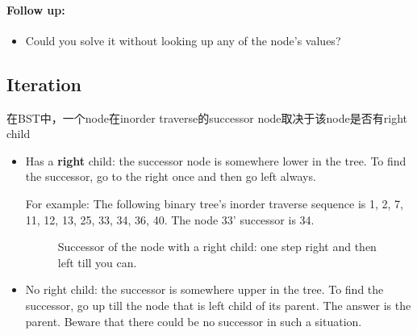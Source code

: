 \paragraph{Follow up:}

\begin{itemize}
\item Could you solve it without looking up any of the node's values?
\end{itemize}

\subsection{Iteration}
在BST中，一个node在inorder traverse的successor node取决于该node是否有right child

\begin{itemize}
\item Has a \textbf{right} child: the successor node is somewhere lower in the tree. To find the successor, go to the right once and then go left always.

For example: The following binary tree's inorder traverse sequence is 1, 2, 7, 11, 12, 13, 25, 33, 34, 36, 40. The node 33' successor is 34.
\begin{figure}[H]
\caption{Successor of the node with a right child: one step right and then left till you can.}
\end{figure}
\item No right child: the successor is somewhere upper in the tree. To find the successor, go up till the node that is left child of its parent. The answer is the parent. Beware that there could be no successor in such a situation.


\end{itemize}

